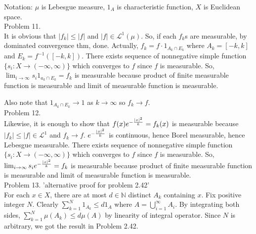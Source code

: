 Notation: $\mu$ is Lebesgue measure, $1_A$ is characteristic function, $X$ is Euclidean space.\\

Problem 11. \\

It is obvious that $ \lvert f_k \rvert \leq \lvert f \rvert$ and $\lvert f \rvert \in \mathcal{L}^1(\mu)$.
So, if each $f_k$s are measurable, by dominated convergence thm, done.
Actually, $f_k = f \cdot 1_{A_k \cap E_k}$ where $A_k = \left [ -k, k \right ]$ and $E_k = f^{-1} (\left [ -k, k \right])$.
There exists sequence of nonnegative simple function $\{s_i: X \rightarrow (-\infty, \infty) \}$ which converges to $f$ since $f$ is measurable.
So, $\lim_{i\rightarrow \infty} s_i 1_{a_k \cap E_k} = f_k$ is measurable because product of finite measurable function is measurable and limit of measurable function is measurable.

Also note that $1_{A_k \cap E_k} \rightarrow 1$ as $k \rightarrow \infty$ so $f_k \rightarrow f$.\\


Problem 12. \\

Likewise, it is enough to show that $f(x) e^{-{ {\lvert x \rvert}^2 \over k}} = f_k(x)$ is measurable because $\lvert f_k \rvert \leq \lvert f \rvert \in \mathcal{L}^1$ and $f_k \rightarrow f$.
$e^{-{ {\lvert x \rvert}^2 \over k}}$ is continuous, hence Borel measurable, hence Lebesgue measurable.
There exists sequence of nonnegative simple function $\{s_i : X \rightarrow \left (-\infty, \infty \right ) \}$ which converges to $f$ since $f$ is measurable.
So, $\lim_{i \rightarrow \infty} s_i e^{-{ {\lvert x \rvert}^2 \over k}} = f_k$ is measurable because product of finite measurable function is measurable and limit of measurable function is measurable.\\

Problem 13. 'alternative proof for problem 2.42' \\

For each $x \in X$, there are at most $d\in \mathbb{N}$ distinct $A_k$ containing $x$.
Fix positive integer $N$.
Clearly $\sum_{k=1}^N 1_{A_k} \leq d 1_A$ where $A = \bigcup_{i=1}^{\infty}A_i$.
By integrating both sides, $\sum_{k=1}^N \mu(A_k) \leq d \mu(A)$ by linearity of integral operator.
Since $N$ is arbitrary, we got the result in Problem 2.42.\\



